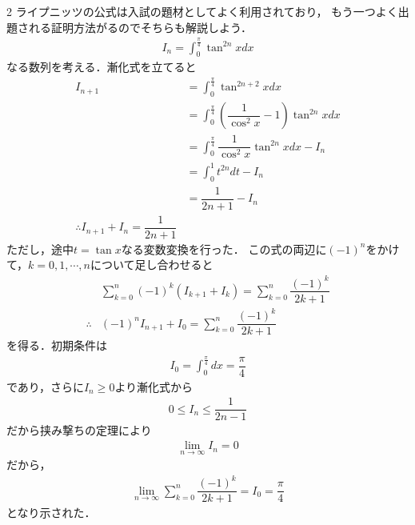 \documentclass[../../main.tex]{subfiles}
\begin{document}
\begin{multicols}{2}
  ライプニッツの公式は入試の題材としてよく利用されており，
  もう一つよく出題される証明方法がるのでそちらも解説しよう．
  \begin{align}
    I_n = \int_{0}^{\frac{\pi}{4}} \tan^{2n}x dx
  \end{align}
  なる数列を考える．漸化式を立てると
  \begin{align}
    I_{n+1}
    & = \int_{0}^{\frac{\pi}{4}} \tan^{2n+2}x dx                               \\
    & = \int_{0}^{\frac{\pi}{4}} \left(\dfrac{1}{\cos^2x}-1\right)\tan^{2n}x dx \\
    & = \int_{0}^{\frac{\pi}{4}} \dfrac{1}{\cos^2x}\tan^{2n}x dx - I_n          \\
    & = \int_{0}^{1} t^{2n} dt - I_n                                           \\
    & = \dfrac{1}{2n+1} - I_n                                                   \\
    \therefore
    I_{n+1} + I_{n} = \dfrac{1}{2n+1}
  \end{align}
  ただし，途中$t=\tan x$なる変数変換を行った．
  この式の両辺に$(-1)^{n}$をかけて，$k=0,1,\cdots,n$について足し合わせると
  \begin{align}
    & \sum_{k=0}^{n} (-1)^{k}\left(I_{k+1} + I_{k}\right) = \sum_{k=0}^{n} \dfrac{(-1)^{k}}{2k+1} \\
    \therefore
    & (-1)^{n}I_{n+1} + I_0 = \sum_{k=0}^{n} \dfrac{(-1)^{k}}{2k+1}
  \end{align}
  を得る．初期条件は
  \begin{align}
    I_0 = \int_{0}^{\frac{\pi}{4}} dx = \dfrac{\pi}{4}
  \end{align}
  であり，さらに$I_{n}\ge 0$より漸化式から
  \begin{align}
    0 \le I_{n} \le \dfrac{1}{2n-1}
  \end{align}
  だから挟み撃ちの定理により
  \begin{align}
    \lim_{n\to\infty} I_{n} = 0
  \end{align}
  だから，
  \begin{align}
    \lim_{n\to\infty} \sum_{k=0}^{n} \dfrac{(-1)^{k}}{2k+1} = I_0 = \dfrac{\pi}{4}
  \end{align}
  となり示された．

  \newpage
\end{multicols}
\end{document}
